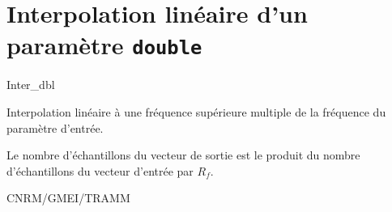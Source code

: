 %
\section{Interpolation lin\'eaire d'un param\`etre {\tt double}}

 {\sf Inter\_dbl}

Interpolation lin\'eaire \`a une fr\'equence
sup\'erieure multiple de la fr\'equence du 
param\`etre d'entr\'ee.

\bigskip







Le nombre d'\'echantillons du vecteur de sortie est le produit du
nombre d'\'echantillons du vecteur d'entr\'ee par $R_f$.


CNRM/GMEI/TRAMM

